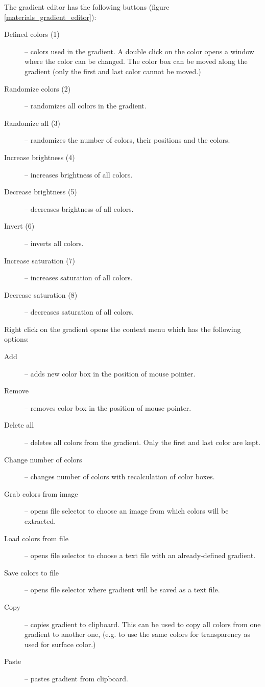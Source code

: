 The gradient editor has the following buttons (figure \ref{materials_gradient_editor}):
\nopagebreak
\begin{description}
	\item[Defined colors (1)] -- colors used in the gradient. A double click on the color opens a window where the color can be changed. The color box can be moved along the gradient (only the first and last color cannot be moved.)
	\item[Randomize colors (2)] -- randomizes all colors in the gradient.
	\item[Randomize all (3)] -- randomizes the number of colors, their positions and the colors.
	\item[Increase brightness (4)] -- increases brightness of all colors.
	\item[Decrease brightness (5)] -- decreases brightness of all colors.
	\item[Invert (6)] -- inverts all colors.
	\item[Increase saturation (7)] -- increases saturation of all colors.
	\item[Decrease saturation (8)] -- decreases saturation of all colors.
\end{description}

Right click on the gradient opens the context menu which has the following options:
\nopagebreak
\begin{description}
	\item[Add] -- adds new color box in the position of mouse pointer.
	\item[Remove] -- removes color box in the position of mouse pointer.
	\item[Delete all] -- deletes all colors from the gradient. Only the first and last color are kept.
	\item[Change number of colors] -- changes number of colors with recalculation of color boxes.
	\item[Grab colors from image] -- opens file selector to choose an image from which colors will be extracted.
	\item[Load colors from file] -- opens file selector to choose a text file with an already-defined gradient.
	\item[Save colors to file] -- opens file selector where gradient will be saved as a text file.
	\item[Copy] -- copies gradient to clipboard. This can be used to copy all colors from one gradient to another one, (e.g. to use the same colors for transparency as used for surface color.)
	\item[Paste] -- pastes gradient from clipboard. 
\end{description}

